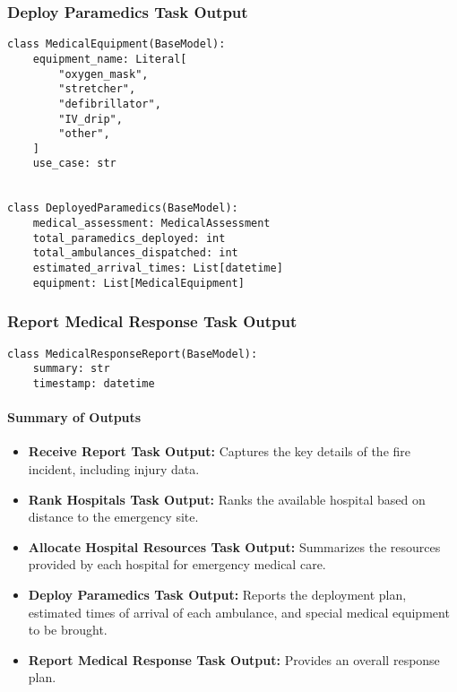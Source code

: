 \subsubsection{Deploy Paramedics Task Output}
\begin{lstlisting}[caption={Pydantic model for Deploy Paramedics Task Output}]
class MedicalEquipment(BaseModel):
    equipment_name: Literal[
        "oxygen_mask",
        "stretcher",
        "defibrillator",
        "IV_drip",
        "other",
    ]
    use_case: str


class DeployedParamedics(BaseModel):
    medical_assessment: MedicalAssessment
    total_paramedics_deployed: int
    total_ambulances_dispatched: int
    estimated_arrival_times: List[datetime]
    equipment: List[MedicalEquipment]
\end{lstlisting}

\subsubsection{Report Medical Response Task Output}
\begin{lstlisting}[caption={Pydantic model for Report Medical Response Task Output}]
class MedicalResponseReport(BaseModel):
    summary: str
    timestamp: datetime
\end{lstlisting}

\paragraph{Summary of Outputs}
\begin{itemize}
    \item \textbf{Receive Report Task Output:} Captures the key details of the fire incident, including injury data.
    \item \textbf{Rank Hospitals Task Output:} Ranks the available hospital based on distance to the emergency site.
    \item \textbf{Allocate Hospital Resources Task Output:} Summarizes the resources provided by each hospital for emergency medical care.
    \item \textbf{Deploy Paramedics Task Output:} Reports the deployment plan, estimated times of arrival of each ambulance, and special medical equipment to be brought.
    \item \textbf{Report Medical Response Task Output:} Provides an overall response plan.
\end{itemize}